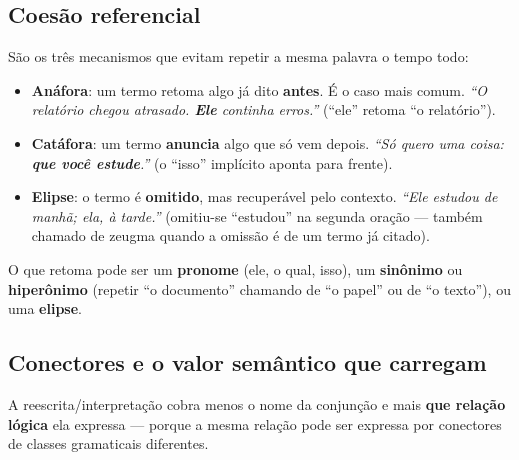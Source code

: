 \subsection{Coesão referencial}

\begin{conceito}
São os três mecanismos que evitam repetir a mesma palavra o tempo todo:

\begin{itemize}
\item \textbf{Anáfora}: um termo retoma algo já dito \textbf{antes}. É o caso
mais comum. \textit{“O relatório chegou atrasado. \textbf{Ele} continha
erros.”} (“ele” retoma “o relatório”).
\item \textbf{Catáfora}: um termo \textbf{anuncia} algo que só vem depois.
\textit{“Só quero uma coisa: \textbf{que você estude}.”} (o “isso” implícito
aponta para frente).
\item \textbf{Elipse}: o termo é \textbf{omitido}, mas recuperável pelo
contexto. \textit{“Ele estudou de manhã; ela, à tarde.”} (omitiu-se
“estudou” na segunda oração --- também chamado de zeugma quando a omissão é
de um termo já citado).
\end{itemize}

O que retoma pode ser um \textbf{pronome} (ele, o qual, isso), um
\textbf{sinônimo} ou \textbf{hiperônimo} (repetir “o documento” chamando de
“o papel” ou de “o texto”), ou uma \textbf{elipse}.
\end{conceito}

\subsection{Conectores e o valor semântico que carregam}

A reescrita/interpretação cobra menos o nome da conjunção e mais \textbf{que
relação lógica} ela expressa --- porque a mesma relação pode ser expressa por
conectores de classes gramaticais diferentes.


